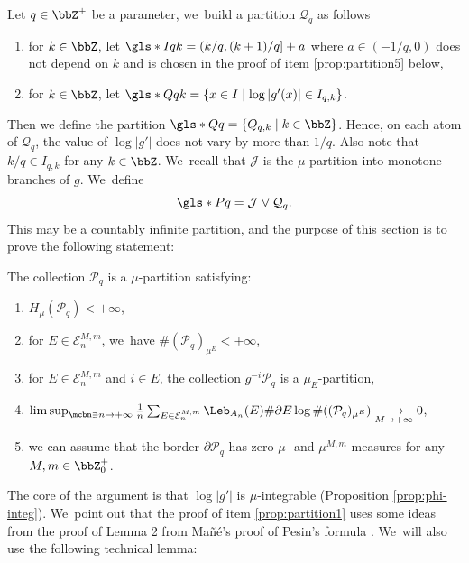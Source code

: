 Let $q \in \bbZ^+$ be a parameter, we~build a partition $\mathcal{Q}_q$ as follows
\begin{enumerate}
\item
 for $k \in \bbZ$, let $\gls*{Iqk} = (k/q, (k+1)/q] + a$ where $a \in (-1/q, 0)$ does not depend on $k$ and is chosen in the proof of item \eqref{prop:partition5} below,
\item
 for $k \in \bbZ$, let
$\gls*{Qqk} = \{ x \in I \mid \log |g'(x)| \in I_{q,k} \}$.
\end{enumerate}
Then we define the partition
$\gls*{Qq} = \{ Q_{q,k} \mid k \in \bbZ \}$. Hence, on each atom of $\mathcal{Q}_q$, the value of $\log |g'|$ does not vary by more than $1/q$.
Also note that $k/q \in I_{q,k}$ for any $k \in \bbZ$. We~recall that $\mathcal{J}$ is the $\mu$-partition into monotone branches of $g$. We~define
\[
\gls*{Pq} = \mathcal{J} \vee \mathcal{Q}_q.
\]
This may be a countably infinite partition, and the purpose of this section is to prove the following statement:

\begin{prop}
\label{prop:partition}
The collection $\mathcal{P}_q$ is a $\mu$-partition satisfying:
\begin{enumerate}
\item\label{prop:partition1}
 $H_{\mu}(\mathcal{P}_q) < + \infty$,
\item\label{prop:partition2}
 for $E \in \mathcal{E}_n^{M,m}$, we~have $\# (\mathcal{P}_q)_{\mu^E} < + \infty$,
\item\label{prop:partition3}
 for $E \in \mathcal{E}_n^{M,m}$ and $i \in E$, the collection $g^{-i} \mathcal{P}_q$ is a $\mu_E$-partition,
\item\label{prop:partition4}
 $\limsup_{\mcbn \ni n \to +\infty} \frac{1}{n}\sum_{E \in \mathcal{E}_n^{M,m}} \Leb_{A_n}(E) \# \partial E \log \# ((\mathcal{P}_q)_{\mu^E}) \underset{M \to +\infty}{\longrightarrow} 0$,
\item\label{prop:partition5}
 we can assume that the border $\partial \mathcal{P}_q$ has zero $\mu$- and $\mu^{M,m}$-measures for any $M,m \in \bbZ_0^+$.
\end{enumerate}
\end{prop}

The core of the argument is that $\log |g'|$ is $\mu$-integrable (Proposition \ref{prop:phi-integ}). We~point out that the proof of item \eqref{prop:partition1} uses some ideas from the proof of Lemma 2 from Mañé's proof of Pesin's formula \cite{Mane_Pesin}. We~will also use the following technical lemma:

